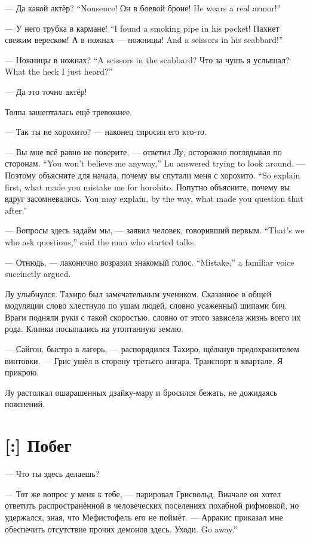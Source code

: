 {--- Да какой актёр?}
{``Nonsence!}
{Он в боевой броне!}
{He wears a real armor!''}

{--- У него трубка в кармане!}
{``I found a smoking pipe in his pocket!}
Пахнет свежим вереском!
{А в ножнах --- ножницы!}
{And a scissors in his scabbard!''}

{--- Ножницы в ножнах?}
{``A scissors in the scabbard?}
{Что за чушь я услышал?}
{What the heck I just heard?''}

--- Да это точно актёр!

Толпа зашепталась ещё тревожнее.

--- Так ты не хорохито? --- наконец спросил его кто-то.

{--- Вы мне всё равно не поверите, --- ответил Лу, осторожно поглядывая по сторонам.}
{``You won't believe me anyway,'' Lu answered trying to look around.}
{--- Поэтому объясните для начала, почему вы спутали меня с хорохито.}
{``So explain first, what made you mistake me for horohito.}
{Попутно объясните, почему вы вдруг засомневались.}
{You may explain, by the way, what made you question that after.''}

{--- Вопросы здесь задаём мы, --- заявил человек, говоривший первым.}
{``That's we who ask questions,'' said the man who started talks.}

{--- Отнюдь, --- лаконично возразил знакомый голос.}
{``Mistake,'' a familiar voice succinctly argued.}

Лу улыбнулся.
Тахиро был замечательным учеником.
Сказанное в общей модуляции слово хлестнуло по ушам людей, словно усаженный шипами бич.
Враги подняли руки с такой скоростью, словно от этого зависела жизнь всего их рода.
Клинки посыпались на утоптанную землю.

--- Сайгон, быстро в лагерь, --- распорядился Тахиро, щёлкнув предохранителем винтовки.
--- Грис ушёл в сторону третьего ангара.
Транспорт в квартале.
Я прикрою.

Лу растолкал ошарашенных дзайку-мару и бросился бежать, не дожидаясь пояснений.

\section{[:] Побег}

\textspace

--- Что ты здесь делаешь?

--- Тот же вопрос у меня к тебе, --- парировал Грисвольд.
Вначале он хотел ответить распространённой в человеческих поселениях похабной рифмовкой, но удержался, зная, что Мефистофель его не поймёт.
--- Арракис приказал мне обеспечить отсутствие прочих демонов здесь.
{Уходи.}
{Go away.''}

